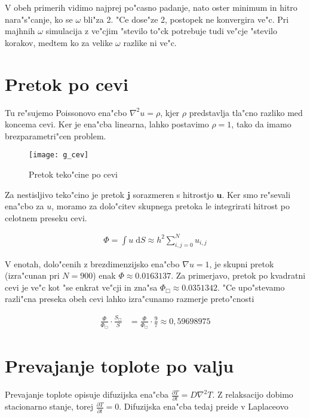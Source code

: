 \documentclass[a4paper,10pt]{article}
\renewcommand{\vec}{\mathbf}
\newcommand{\dd}{\mathrm{d}}
\newcommand{\parcialno}[2]{
  \frac{\partial #1}{\partial #2}
}
\begin{document}
V obeh primerih vidimo najprej po"casno padanje, nato oster minimum in hitro nara"s"canje, ko se $\omega$ bli"za 2. "Ce dose"ze 2, postopek ne konvergira ve"c. Pri majhnih $\omega$ simulacija z ve"cjim "stevilo to"ck potrebuje tudi ve"cje "stevilo korakov, medtem ko za velike $\omega$ razlike ni ve"c. 

\section{Pretok po cevi}

Tu re"sujemo Poissonovo ena"cbo $\nabla^2 u = \rho$, kjer $\rho$ predstavlja tla"cno razliko med koncema cevi. Ker je ena"cba linearna, lahko postavimo $\rho=1$, tako da imamo brezparametri"cen problem. 

\begin{figure}[H]
\centering
  \texttt{[image: g\_cev]}
  \caption{Pretok teko"cine po cevi}
  \label{fig:cev}
\end{figure}

Za nestisljivo teko"cino je pretok $\vec j$ sorazmeren s hitrostjo $\vec u$. Ker smo re"sevali ena"cbo za $u$, moramo za dolo"citev skupnega pretoka le integrirati hitrost po celotnem preseku cevi. 

\begin{align}
  \Phi = \int \! u\; \dd S \approx h^2 \sum_{i,j=0}^N u_{i,j} 
\end{align}


V enotah, dolo"cenih z brezdimenzijsko ena"cbo $\nabla u = 1$, je skupni pretok (izra"cunan pri $N=900$) enak $\Phi \approx 0.0163137$. Za primerjavo, pretok po kvadratni cevi je ve"c kot "se enkrat ve"cji in zna"sa $\Phi_\Box \approx 0.0351342$. "Ce upo"stevamo razli"cna preseka obeh cevi lahko izra"cunamo razmerje preto"cnosti

\begin{align}
  \frac{\Phi}{\Phi_\Box} \cdot \frac{S_\Box}{S} &= \frac{\Phi}{\Phi_\Box} \cdot \frac{9}{7} \approx 0,59698975
\end{align}

\section{Prevajanje toplote po valju}

Prevajanje toplote opisuje difuzijska ena"cba $\parcialno{T}{t} = D\nabla^2 T$. Z relaksacijo dobimo stacionarno stanje, torej $\parcialno{T}{t} = 0$. Difuzijska ena"cba tedaj preide v Laplaceovo
\end{document}
